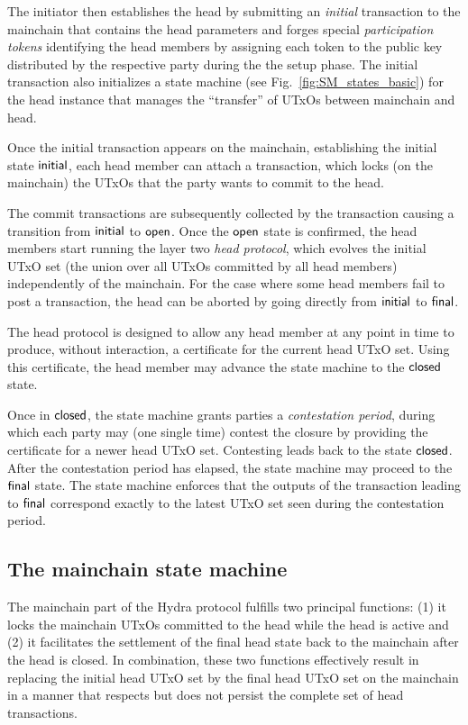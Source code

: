 The initiator then establishes the head by submitting an
\emph{initial} transaction to the mainchain that contains the
head parameters and forges special \emph{participation tokens}
identifying the head members by assigning each token to the public key
distributed by the respective party during the the setup phase.
The initial transaction also initializes a state machine
(see Fig.~\ref{fig:SM_states_basic}) for the head instance that manages
the ``transfer'' of UTxOs between mainchain and head.

Once the initial transaction appears on the mainchain, establishing
the initial state $\mathsf{initial}$, each head member can attach a
\mtxCom{} transaction, which locks (on the mainchain) the UTxOs that
the party wants to commit to the head.

The commit transactions are subsequently collected by the \mtxCCom{} transaction
causing a transition from $\mathsf{initial}$ to $\mathsf{open}$. Once the $\mathsf{open}$ state is
confirmed, the head members start running the layer two \emph{head protocol},
which evolves the initial UTxO set (the union over all UTxOs committed by all
head members) independently of the mainchain. For the case where some head
members fail to post a \mtxCom{} transaction, the head can be aborted by going
directly from $\mathsf{initial}$ to $\mathsf{final}$.

The head protocol is designed to allow any head member
at any point in time to produce, without interaction, a certificate 
for the current head UTxO set.  Using this certificate, the head member
may advance the state machine to the $\mathsf{closed}$ state.

Once in $\mathsf{closed}$, the state machine grants parties a
\emph{contestation period}, during which each party may (one single
time) contest the closure by providing the certificate for a newer head
UTxO set.  Contesting leads back to the state $\mathsf{closed}$.
After the contestation period has elapsed, the state machine may proceed
to the $\mathsf{final}$ state.  The state machine enforces that the
outputs of the transaction leading to $\mathsf{final}$ correspond exactly to
the latest UTxO set seen during the contestation period.


\subsection{The mainchain state machine}\label{sec:overview_mc}

The mainchain part of the Hydra protocol fulfills two principal
functions: (1) it locks the mainchain UTxOs committed %
to the head while the head is active and (2) it facilitates the
settlement of the final head state back to the mainchain after the
head is closed. In combination, these two functions effectively result
in replacing the initial head UTxO set by the final head UTxO set on
the mainchain in a manner that respects but does not persist the
complete set of head transactions.


